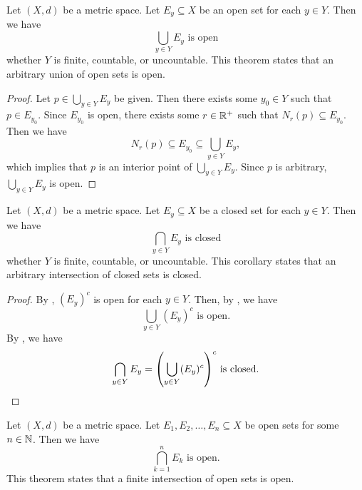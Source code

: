 \bigskip

\begin{theorem} \label{thm:ArbitraryUnionOfOpenSetsIsOpen}
    Let $(X, d)$ be a metric space. Let $E_{y} \subseteq X$ be an open set for each $y \in Y$. Then we have
    \[
    \bigcup_{y \in Y} E_{y} \text{ is open}
    \]
    whether $Y$ is finite, countable, or uncountable. This theorem states that an arbitrary union of open sets is open.
\end{theorem}

\begin{proof}
    Let $p \in \displaystyle \bigcup_{y \in Y} E_{y}$ be given. Then there exists some $y_{0} \in Y$
    such that $p \in E_{y_{0}}$. Since $E_{y_{0}}$ is open, there exists some $r \in \mathbb{R}^{+}$
    such that $N_{r}(p) \subseteq E_{y_{0}}$. Then we have
    \[
    N_{r}(p) \subseteq E_{y_{0}} \subseteq \bigcup_{y \in Y} E_{y},
    \]
    which implies that $p$ is an interior point of $\displaystyle \bigcup_{y \in Y} E_{y}$.
    Since $p$ is arbitrary, $\displaystyle \bigcup_{y \in Y} E_{y}$ is open.
\end{proof}

\bigskip

\begin{corollary} \label{cor:ArbitraryIntersectionOfClosedSetsIsClosed}
    Let $(X, d)$ be a metric space. Let $E_{y} \subseteq X$ be a closed set for each $y \in Y$. Then we have
    \[
    \bigcap_{y \in Y} E_{y} \text{ is closed}
    \]
    whether $Y$ is finite, countable, or uncountable. This corollary states
    that an arbitrary intersection of closed sets is closed.
\end{corollary}

\begin{proof}
    By , $(E_{y})^{c}$ is open for each $y \in Y$.
    Then, by , we have
    \[
    \bigcup_{y \in Y} (E_{y})^{c} \text{ is open.}
    \]
    By , we have
    \[
    \bigcap_{y \in Y} E_{y} = \paren*{\bigcup_{y \in Y} (E_{y})^{c}}^{c} \text{ is closed.}
    \]
\end{proof}

\bigskip

\begin{theorem} \label{thm:FiniteIntersectionOfOpenSetsIsOpen}
    Let $(X, d)$ be a metric space. Let $E_{1}, E_{2}, \dots, E_{n} \subseteq X$
    be open sets for some $n \in \mathbb{N}$. Then we have
    \[
    \bigcap_{k = 1}^{n} E_{k} \text{ is open.}
    \]
    This theorem states that a finite intersection of open sets is open.
\end{theorem}

